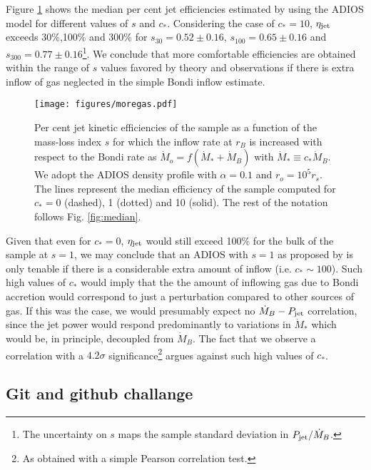\documentclass[useAMS,usenatbib]{mn2e}
\begin{document}
Figure \ref{fig:moregas} shows the median per cent jet efficiencies estimated by using the ADIOS model for different values of $s$ and $c_*$. Considering the case of $c_*=10$, $\eta_{\rm jet}$ exceeds 30\%,100\% and 300\% for $s_{30}=0.52 \pm 0.16$, $s_{100}=0.65 \pm 0.16$ and $s_{300}=0.77 \pm 0.16$\footnote{The uncertainty on $s$ maps the sample standard deviation in $P_{\rm jet}/\dot{M}_B$.}. We conclude that more comfortable efficiencies are obtained within the range of $s$ values favored by theory and observations if there is extra inflow of gas neglected in the simple Bondi inflow estimate. 

\begin{figure}
\centering
\texttt{[image: figures/moregas.pdf]}
\caption{Per cent jet kinetic efficiencies of the sample as a function of the mass-loss index $s$ for which the inflow rate at $r_B$ is increased with respect to the Bondi rate as $\dot{M}_o=f (\dot{M}_*+\dot{M}_B)$ with $\dot{M}_* \equiv c_* \dot{M}_B$. We adopt the ADIOS density profile with $\alpha=0.1$ and $r_o=10^5 r_s$. The lines represent the median efficiency of the sample computed for $c_* = 0$ (dashed), 1 (dotted) and 10 (solid). The rest of the notation follows Fig. \ref{fig:median}.}
\label{fig:moregas}
\end{figure}

Given that even for $c_*=0$, $\eta_{\rm jet}$ would still exceed 100\% for the bulk of the sample at $s=1$, we may conclude that an ADIOS with $s=1$ as proposed by \cite{Begelman12} is only tenable if there is a considerable extra amount of inflow (i.e. $c_* \sim 100$). 
Such high values of $c_*$ would imply that the the amount of inflowing gas due to Bondi accretion would correspond to just a perturbation compared to other sources of gas. If this was the case, we would presumably expect no $\dot{M}_B-P_{\rm jet}$ correlation, since the jet power would respond predominantly to variations in $\dot{M}_*$ which would be, in principle, decoupled from $\dot{M}_B$. The fact that we observe a correlation with a $4.2\sigma$ significance\footnote{As obtained with a simple Pearson correlation test.} argues against such high values of $c_*$. 


\subsection{Git and github challange}
\end{document}
